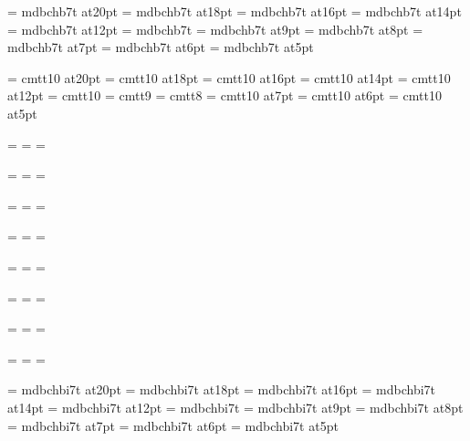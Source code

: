 \font\twentybf=     mdbchb7t at20pt
\font\eighteenbf=   mdbchb7t at18pt
\font\sixteenbf=    mdbchb7t at16pt
\font\fourteenbf=   mdbchb7t at14pt
\font\twelvebf=     mdbchb7t at12pt
\font\tenbf=        mdbchb7t
\font\ninebf=       mdbchb7t at9pt
\font\eightbf=      mdbchb7t at8pt
\font\sevenbf=      mdbchb7t at7pt
\font\sixbf=        mdbchb7t at6pt
\font\fivebf=       mdbchb7t at5pt

\font\twentytt=     cmtt10 at20pt
\font\eighteentt=   cmtt10 at18pt
\font\sixteentt=    cmtt10 at16pt
\font\fourteentt=   cmtt10 at14pt
\font\twelvett=     cmtt10 at12pt
\font\tentt=        cmtt10
\font\ninett=       cmtt9
\font\eighttt=      cmtt8
\font\seventt=      cmtt10 at7pt
\font\sixtt=        cmtt10 at6pt
\font\fivett=       cmtt10 at5pt




=\tenrm
{}=\sevenrm
{}=\fiverm
\def\rm{\fam=0 \tenrm}

=\teni
{}=\seveni
{}=\fivei
\def\mit{\fam=1}

=\tensy
{}=\sevensy
{}=\fivesy
\def\cal{\fam=2}

=\tenex
{}=\sevenex
{}=\fiveex


\def\it{\fam=\itfam \tenit}
\textfont\itfam=\tenit
\scriptfont\itfam=\sevenit
\scriptscriptfont\itfam=\fiveit

\def\sl{\fam=\slfam \tensl}
\textfont\slfam=\tensl
\scriptfont\slfam=\sevensl
\scriptscriptfont\slfam=\fivesl

\def\bf{\fam=\bffam \tenbf}
\textfont\bffam=\tenbf
\scriptfont\bffam=\sevenbf
\scriptscriptfont\bffam=\fivebf

\def\tt{\fam=\ttfam \tentt}
\textfont\ttfam=\tentt
\scriptfont\ttfam=\seventt
\scriptscriptfont\ttfam=\fivett

\font\twentyitbf=      mdbchbi7t at20pt
\font\eighteenitbf=    mdbchbi7t at18pt
\font\sixteenitbf=     mdbchbi7t at16pt
\font\fourteenitbf=    mdbchbi7t at14pt
\font\twelveitbf=      mdbchbi7t at12pt
\font\itbf=            mdbchbi7t
\font\nineitbf=        mdbchbi7t at9pt
\font\eightitbf=       mdbchbi7t at8pt
\font\sevenitbf=       mdbchbi7t at7pt
\font\sixitbf=         mdbchbi7t at6pt
\font\fiveitbf=        mdbchbi7t at5pt

